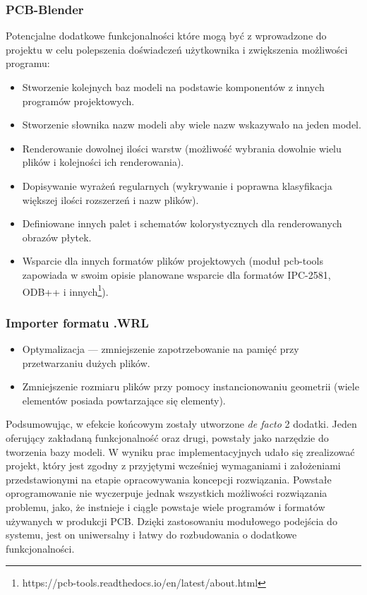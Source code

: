 \documentclass[brudnopis]{xmgr}
\begin{document}
\subsubsection{PCB-Blender}
Potencjalne dodatkowe funkcjonalności które mogą być z wprowadzone do projektu w celu polepszenia doświadczeń użytkownika i zwiększenia możliwości programu:
\begin{itemize}
\item Stworzenie kolejnych baz modeli na podstawie komponentów z innych programów projektowych.
\item Stworzenie słownika nazw modeli aby wiele nazw wskazywało na jeden model.
\item Renderowanie dowolnej ilości warstw (możliwość wybrania dowolnie wielu plików i kolejności ich renderowania).
\item Dopisywanie wyrażeń regularnych (wykrywanie i poprawna klasyfikacja większej ilości rozszerzeń i nazw plików).
\item Definiowane innych palet i schematów kolorystycznych dla renderowanych obrazów płytek.
\item Wsparcie dla innych formatów plików projektowych (moduł pcb-tools zapowiada w swoim opisie planowane wsparcie dla formatów IPC-2581, ODB++ i innych\footnote{https://pcb-tools.readthedocs.io/en/latest/about.html}).
\end{itemize}

\subsubsection{Importer formatu .WRL}
\begin{itemize}
\item Optymalizacja --- zmniejszenie zapotrzebowanie na pamięć przy przetwarzaniu dużych plików.
\item Zmniejszenie rozmiaru plików przy pomocy instancionowaniu geometrii (wiele elementów posiada powtarzające się elementy).
\end{itemize}

\summary
Podsumowując, w efekcie końcowym zostały utworzone \emph{de facto} 2 dodatki. Jeden oferujący zakładaną funkcjonalność oraz drugi, powstały jako narzędzie do tworzenia bazy modeli. W wyniku prac implementacyjnych udało się zrealizować projekt, który jest zgodny z przyjętymi wcześniej wymaganiami i założeniami przedstawionymi na etapie opracowywania koncepcji rozwiązania. Powstałe oprogramowanie nie wyczerpuje jednak wszystkich możliwości rozwiązania problemu, jako, że instnieje i ciągle powstaje wiele programów i formatów używanych w produkcji PCB. Dzięki zastosowaniu modułowego podejścia do systemu, jest on uniwersalny i łatwy do rozbudowania o dodatkowe funkcjonalności.





\listoftables

\listoffigures

\oswiadczenie
\end{document}
